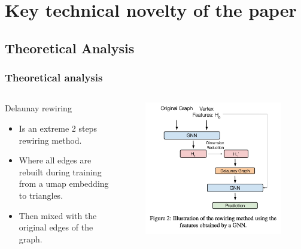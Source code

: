 \documentclass[10pt, aspectratio = 169]{beamer}
\begin{document}
\section{Key technical novelty of the paper}

\subsection{Theoretical Analysis}



\begin{frame}
    \frametitle{Theoretical analysis}
    \begin{columns}
        \begin{column}{0.4\textwidth}
        \begin{block}{Delaunay rewiring}
            \begin{itemize}
                \item Is an extreme 2 steps rewiring method.
                \item Where all edges are rebuilt during training from a umap embedding to triangles.
                \item Then mixed with the original edges of the graph.
            \end{itemize}
        \end{block}
        \end{column}
        \begin{column}{0.4\textwidth}
            \begin{figure}
                \includegraphics[width=0.99\textwidth]{figures/Rewiring_method.png}
            \end{figure}
            

\end{column}
\end{columns}
\end{frame}
\end{document}
